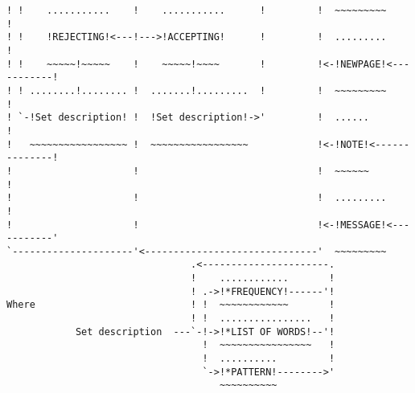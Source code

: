 \begin{verbatim}
! !    ...........    !    ...........      !         !  ~~~~~~~~~            !
! !    !REJECTING!<---!--->!ACCEPTING!      !         !  .........            !
! !    ~~~~~!~~~~~    !    ~~~~~!~~~~       !         !<-!NEWPAGE!<-----------!
! ! ........!........ !  .......!.........  !         !  ~~~~~~~~~            !
! `-!Set description! !  !Set description!->'         !  ......               !
!   ~~~~~~~~~~~~~~~~~ !  ~~~~~~~~~~~~~~~~~            !<-!NOTE!<--------------!
!                     !                               !  ~~~~~~               !
!                     !                               !  .........            !
!                     !                               !<-!MESSAGE!<-----------'
`---------------------'<------------------------------'  ~~~~~~~~~
                                .<----------------------.
                                !    ............       !
                                ! .->!*FREQUENCY!------'!
Where                           ! !  ~~~~~~~~~~~~       !
                                ! !  ................   !
            Set description  ---`-!->!*LIST OF WORDS!--'!
                                  !  ~~~~~~~~~~~~~~~~   !
                                  !  ..........         !
                                  `->!*PATTERN!-------->'
                                     ~~~~~~~~~~
\end{verbatim}

